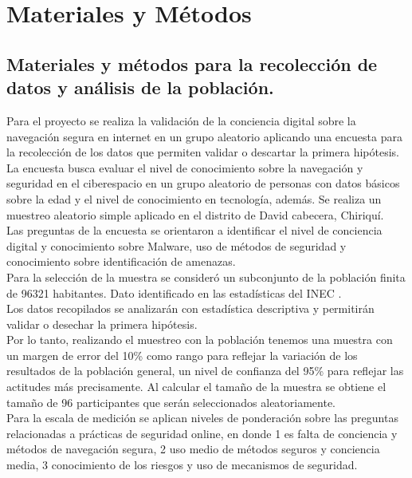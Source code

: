 \chapter{Materiales y Métodos}\label{cap:capitulo_3}

\section{Materiales y métodos para la recolección de datos y análisis de la
	 población.}\label{section:Materiales y métodos para la recolección de datos y análisis de la población } 
Para el proyecto se realiza la validación de la conciencia digital sobre la navegación segura en internet en un grupo aleatorio aplicando una encuesta para la recolección de los datos que permiten validar o descartar la primera hipótesis. La encuesta busca evaluar el nivel de conocimiento sobre la navegación y seguridad en el ciberespacio en un grupo aleatorio de personas con datos básicos sobre la edad y el nivel de conocimiento en tecnología, además. Se realiza un muestreo aleatorio simple aplicado en el distrito de David cabecera, Chiriquí. \\
Las preguntas de la encuesta se orientaron a identificar el nivel de conciencia digital y conocimiento sobre  Malware, uso de métodos de seguridad y conocimiento sobre identificación de amenazas. \\
Para la selección de la muestra se consideró un subconjunto de la población finita de 96321 habitantes. Dato identificado en las estadísticas del INEC \cite{INEC}. \\
Los datos recopilados se analizarán con estadística descriptiva y permitirán validar o desechar la primera hipótesis. \\
Por lo tanto, realizando el muestreo con la población tenemos una muestra con un margen de error del 10\% como rango para reflejar la variación de los resultados de la población general, un nivel de confianza del 95\% para reflejar las actitudes más precisamente. Al calcular el tamaño de la muestra se obtiene el tamaño de 96 participantes que serán seleccionados aleatoriamente. \\
Para la escala de medición se aplican niveles de ponderación sobre las preguntas relacionadas a prácticas de seguridad online, en donde 1 es falta de conciencia y métodos de navegación segura, 2 uso medio de métodos seguros y conciencia media, 3 conocimiento de los riesgos y uso de mecanismos de seguridad.
